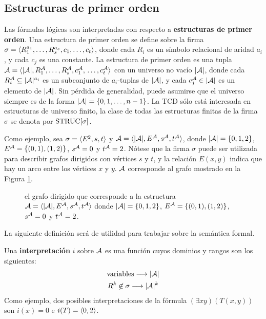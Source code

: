 \subsection{Estructuras de primer orden}
Las fórmulas lógicas son interpretadas con respecto a \textbf{estructuras de primer
orden}. Una estructura de primer orden se define sobre la firma
$\sigma=\langle R_1^{a_1},\ldots,R_s^{a_s},\\c_1,\ldots,c_t \rangle$, donde cada $R_i$ es
un símbolo relacional de aridad $a_i$, y cada $c_j$ es una constante. 
La estructura de primer orden es una tupla
$\mathcal{A}=\langle |\mathcal{A}|,R_1^{\mathcal{A}},\ldots,R_s^{\mathcal{A}},c_1^{\mathcal{A}},\\\ldots,c_t^{\mathcal{A}} \rangle$ con un universo
no vacío $|\mathcal{A}|$, donde cada $R_i^{\mathcal{A}}\subseteq|\mathcal{A}|^{a_i}$ es un subconjunto de
$a_i$-tuplas de $|\mathcal{A}|$, y cada
$c_j^{\mathcal{A}}\in|\mathcal{A}|$ es un elemento de $|\mathcal{A}|$.
Sin pérdida de generalidad, puede asumirse que el universo siempre es de la
forma $|\mathcal{A}|=\{0,1,\ldots,n-1\}$.
La TCD sólo está interesada en estructuras de universo finito, la clase de
todas las estructuras finitas de la firma $\sigma$ se denota por $\text{STRUC}[\sigma]$.

Como ejemplo, sea $\sigma=\langle E^2,s,t \rangle$ y
$\mathcal{A}=\langle |\mathcal{A}|,E^{\mathcal{A}},s^{\mathcal{A}},t^{\mathcal{A}} \rangle$, donde $|\mathcal{A}|=\{0,1,2\}$,
$E^{\mathcal{A}}=\{(0,1),(1,2)\}$, $s^{\mathcal{A}}=0$ y $t^{\mathcal{A}}=2$.
Nótese que la firma $\sigma$ puede ser utilizada para describir grafos
dirigidos con vértices $s$ y $t$, y la relación $E(x, y)$ indica que hay un
arco entre los vértices $x$ y $y$. $\mathcal{A}$ corresponde al grafo mostrado en la
Figura \ref{grafo_simple}.

\begin{figure}[h]
\begin{center}
\end{center}
\caption{el grafo dirigido que corresponde a la estructura $\mathcal{A}=\langle |\mathcal{A}|,E^{\mathcal{A}},s^{\mathcal{A}},t^{\mathcal{A}} \rangle$
donde $|\mathcal{A}|=\{0,1,2\}$, $E^{\mathcal{A}}=\{(0,1),(1,2)\}$, $s^{\mathcal{A}}=0$ y $t^{\mathcal{A}}=2$.}
\label{grafo_simple}
\end{figure}

La siguiente definición será de utilidad para trabajar sobre la semántica
formal.
\begin{definition}
Una \textbf{interpretación} $i$ sobre $\mathcal{A}$ es una función cuyos
dominios y rangos son los siguientes:
\begin{gather*}
\text{variables} \longrightarrow |\mathcal{A}|\\
R^k \not\in \sigma \longrightarrow |\mathcal{A}|^k\\
\end{gather*}
Como ejemplo, dos posibles interpretaciones de la fórmula 
$(\exists xy) (T(x, y))$ son $i(x) = 0$ e $i(T) = \langle 0,2 \rangle$.
\end{definition}

